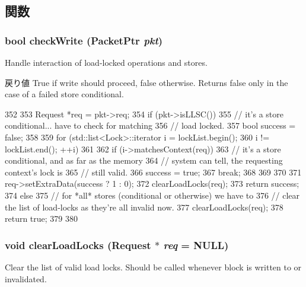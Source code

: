 \subsection{関数}
\hypertarget{classCacheBlk_a52fb137178c5b2a791f2382796c17840}{
\subsubsection[{checkWrite}]{\setlength{\rightskip}{0pt plus 5cm}bool checkWrite ({\bf PacketPtr} {\em pkt})}}
\label{classCacheBlk_a52fb137178c5b2a791f2382796c17840}
Handle interaction of load-\/locked operations and stores. \begin{DoxyReturn}{戻り値}
True if write should proceed, false otherwise. Returns false only in the case of a failed store conditional. 
\end{DoxyReturn}



\begin{DoxyCode}
352     {
353         Request *req = pkt->req;
354         if (pkt->isLLSC()) {
355             // it's a store conditional... have to check for matching
356             // load locked.
357             bool success = false;
358 
359             for (std::list<Lock>::iterator i = lockList.begin();
360                  i != lockList.end(); ++i)
361             {
362                 if (i->matchesContext(req)) {
363                     // it's a store conditional, and as far as the memory
364                     // system can tell, the requesting context's lock is
365                     // still valid.
366                     success = true;
367                     break;
368                 }
369             }
370 
371             req->setExtraData(success ? 1 : 0);
372             clearLoadLocks(req);
373             return success;
374         } else {
375             // for *all* stores (conditional or otherwise) we have to
376             // clear the list of load-locks as they're all invalid now.
377             clearLoadLocks(req);
378             return true;
379         }
380     }
\end{DoxyCode}
\hypertarget{classCacheBlk_a9e0b822a716ddb1833f6be383be068e7}{
\subsubsection[{clearLoadLocks}]{\setlength{\rightskip}{0pt plus 5cm}void clearLoadLocks ({\bf Request} $\ast$ {\em req} = {\ttfamily NULL})}}
\label{classCacheBlk_a9e0b822a716ddb1833f6be383be068e7}
Clear the list of valid load locks. Should be called whenever block is written to or invalidated. 


